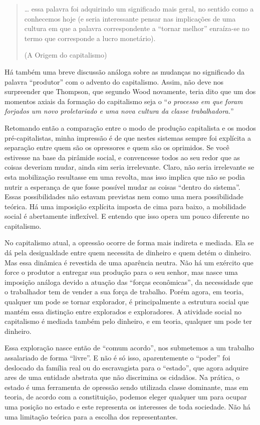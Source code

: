 \begin{quote}
… essa palavra foi adquirindo um significado mais geral, no sentido como a conhecemos hoje (e seria interessante pensar nas implicações de uma cultura em que a palavra correspondente a “tornar melhor” enraíza-se no termo que corresponde a lucro monetário).

(A Origem do capitalismo)
\end{quote}

Há também uma breve discussão análoga sobre as mudanças no significado da palavra “produtor” com o advento do capitalismo. Assim, não deve nos surpreender que Thompson, que segundo Wood novamente, teria dito que um dos momentos axiais da formação do capitalismo seja o “\textit{o processo em que foram forjados um novo proletariado e uma nova cultura da classe trabalhadora.}” 

Retomando então a comparação entre o modo de produção capitalista e os modos pré-capitalistas, minha impressão é de que nestes sistemas sempre foi explícita a separação entre quem são os opressores e quem são os oprimidos. Se você estivesse na base da pirâmide social, e convencesse todos ao seu redor que as coisas deveriam mudar, ainda sim seria irrelevante. Claro, não seria irrelevante se esta mobilização resultasse em uma revolta, mas isso implica que não se podia nutrir a esperança de que fosse possível mudar as coisas “dentro do sistema”. Essas possibilidades não estavam previstas nem como uma mera possibilidade teórica. Há uma imposição explícita imposta de cima para baixo, a mobilidade social é abertamente inflexível. E entendo que isso opera um pouco diferente no capitalismo.

No capitalismo atual, a opressão ocorre de forma mais indireta e mediada. Ela se dá pela desigualdade entre quem necessita de dinheiro e quem detém o dinheiro. Mas essa dinâmica é revestida de uma aparência neutra. Não há um exército que force o produtor a entregar sua produção para o seu senhor, mas nasce uma imposição análoga devido a atuação das “forças econômicas”, da necessidade que o trabalhador tem de vender a sua força de trabalho. Porém agora, em teoria, qualquer um pode se tornar explorador, é principalmente a estrutura social que mantém essa distinção entre explorados e exploradores. A atividade social no capitalismo é mediada também pelo dinheiro, e em teoria, qualquer um pode ter dinheiro.

Essa exploração nasce então de “comum acordo”, nos submetemos a um trabalho assalariado de forma “livre”. E não é só isso, aparentemente o “poder” foi deslocado da família real ou do escravagista para o “estado”, que agora adquire ares de uma entidade abstrata que não discrimina os cidadãos. Na prática, o estado é uma ferramenta de opressão sendo utilizada classe dominante, mas em teoria, de acordo com a constituição, podemos eleger qualquer um para ocupar uma posição no estado e este representa os interesses de toda sociedade. Não há uma limitação teórica para a escolha dos representantes.

